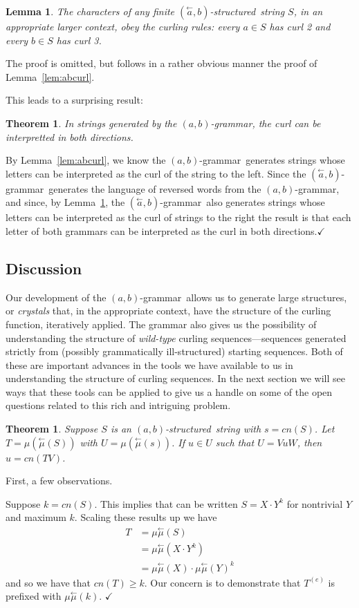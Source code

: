\documentclass[11pt]{article}
\def\emph#1{{\em #1\/}}
\def\term#1{\emph{#1}}
\newcounter{thm}
\newtheorem{theorem}[thm]{Theorem}
\newtheorem{lemma}[thm]{Lemma}
\def\QED{$\checkmark$}
\def\ni{\noindent}
\def\ab{$(a,b)$}
\def\abg{\ab-grammar}
\def\abs{\ab-structured}
\def\la#1{\overset{\leftarrow}{#1}}
\def\rmu{\la{\mu}}
\def\rabg{$(\la{a},b)$-grammar}
\def\rabs{$(\la{a},b)$-structured}
\def\Proof{\ni{\bf Proof:} }
\begin{document}
\begin{lemma}\label{lem:rabcurl}
The characters of any finite \rabs\ string $S$, in an appropriate larger context, obey the curling rules: every $a\in S$ has curl 2 and every $b\in S$ has curl 3.
\end{lemma}
\ni The proof is omitted, but follows in a rather obvious manner the proof
of Lemma~\ref{lem:abcurl}.


This leads to a surprising result:
\begin{theorem}
In strings generated by the \abg, the curl can be interpretted in both directions.
\end{theorem}

\Proof By Lemma~\ref{lem:abcurl}, we know the \abg\ generates strings whose
letters can be interpreted as the curl of the string to the left.  Since
the \rabg\ generates the language of reversed words from the \abg, and since,
by Lemma~\ref{lem:rabcurl}, the \rabg\ also generates strings whose letters
can be interpreted as the curl of strings to the right the result is that
each letter of both grammars can be interpreted as the curl in both directions.\QED




\subsection{Discussion}
Our development of the \abg\ allows us to generate large structures, or
\term{crystals} that, in the appropriate context, have the structure of the
curling function, iteratively applied.  The grammar also gives us the
possibility of understanding the structure of \term{wild-type} curling
sequences---sequences generated strictly from (possibly grammatically
ill-structured) starting sequences.  Both of these are important advances
in the tools we have available to us in understanding the structure of
curling sequences.  In the next section we will see ways that these tools
can be applied to give us a handle on some of the open questions related to
this rich and intriguing problem.

\begin{theorem}\label{thm:scale}
Suppose $S$ is an \abs\ string with $s=cn(S)$.  Let $T=\mu(\rmu(S))$ with
$U=\mu(\rmu(s))$.  If $u\in U$ such that $U=VuW$, then $u=cn(TV)$.
\end{theorem}
\Proof  First, a few observations.

Suppose $k=cn(S)$.  This implies that can be written $S=X\cdot Y^k$ for 
nontrivial $Y$ and maximum $k$.  Scaling these results up we have
\begin{align*}
T&=\mu\rmu(S)\\
&=\mu\rmu(X\cdot Y^k)\\
&=\mu\rmu(X)\cdot\mu\rmu(Y)^k
\end{align*}
\ni and so we have that $cn(T)\ge k$.  Our concern is to demonstrate
that $T^{(e)}$ is prefixed with $\mu\rmu(k)$.
\QED
\end{document}

